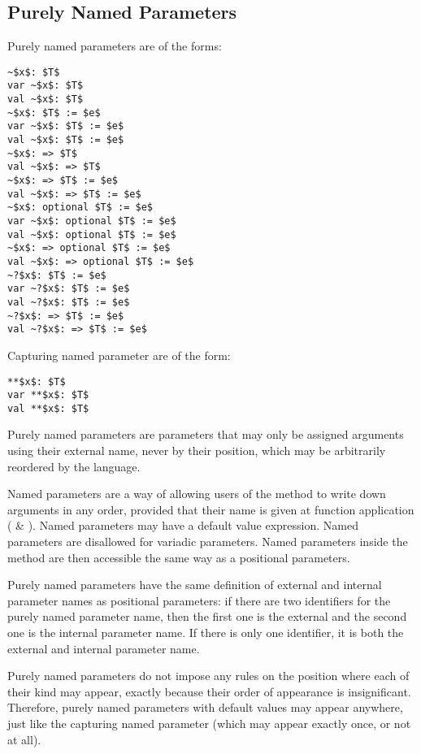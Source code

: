 \subsection{Purely Named Parameters}
\label{sec:named-parameters}
\label{sec:capturing-named-parameter}

Purely named parameters are of the forms:
\begin{lstlisting}
~$x$: $T$
var ~$x$: $T$
val ~$x$: $T$
~$x$: $T$ := $e$
var ~$x$: $T$ := $e$
val ~$x$: $T$ := $e$
~$x$: => $T$
val ~$x$: => $T$
~$x$: => $T$ := $e$
val ~$x$: => $T$ := $e$
~$x$: optional $T$ := $e$
var ~$x$: optional $T$ := $e$
val ~$x$: optional $T$ := $e$
~$x$: => optional $T$ := $e$
val ~$x$: => optional $T$ := $e$
~?$x$: $T$ := $e$
var ~?$x$: $T$ := $e$
val ~?$x$: $T$ := $e$
~?$x$: => $T$ := $e$
val ~?$x$: => $T$ := $e$
\end{lstlisting}

Capturing named parameter are of the form: 
\begin{lstlisting}
**$x$: $T$
var **$x$: $T$
val **$x$: $T$
\end{lstlisting}

Purely named parameters are parameters that may only be assigned arguments using their external name, never by their position, which may be arbitrarily reordered by the language. 

Named parameters are a way of allowing users of the method to write down arguments in any order, provided that their name is given at function application ( \& ). Named parameters may have a default value expression. Named parameters are disallowed for variadic parameters. Named parameters inside the method are then accessible the same way as a positional parameters. 

Purely named parameters have the same definition of external and internal parameter names as positional parameters: if there are two identifiers for the purely named parameter name, then the first one is the external and the second one is the internal parameter name. If there is only one identifier, it is both the external and internal parameter name. 

Purely named parameters do not impose any rules on the position where each of their kind may appear, exactly because their order of appearance is insignificant. Therefore, purely named parameters with default values may appear anywhere, just like the capturing named parameter (which may appear exactly once, or not at all). 

